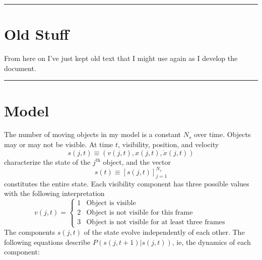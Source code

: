 \documentclass[12pt]{article}
\renewcommand{\th}{^{\text{th}}}
\newcommand{\os}[4]{{\left[ #1(#2) \right]}_{#3}^{#4}} %
\newcommand{\ti}[2]{{#1}{(#2)}}                         %
\begin{document}
\vfill \hrule
\section{Old Stuff}
\label{sec:old-stuff}

From here on I've just kept old text that I might use again as I
develop the document.\\
\hrule
\section{Model}
\label{sec:model}

The number of moving objects in my model is a constant $N_s$ over
time.  Objects may or may not be visible.  At time $t$, visibility,
position, and velocity
\begin{equation*}
  \ti{s}{j,t} \equiv \left(\ti{v}{j,t},\ti{x}{j,t},\ti{\dot x}{j,t} \right)
\end{equation*}
characterize the state of the $j\th$ object, and the vector
\begin{equation*}
  \ti{s}{t} \equiv \os{s}{j,t}{j=1}{N_s}
\end{equation*}
constitutes the entire state.  Each visibility component has three
possible values with the following interpretation
\begin{equation*}
  \ti{v}{j,t} =
  \begin{cases}
    1 & \text{Object is visible} \\
    2 & \text{Object is not visible for this frame} \\
    3 & \text{Object is not visible for at least three frames}
  \end{cases}
\end{equation*}
The components $\ti{s}{j,t}$ of the state evolve independently of each
other.  The following equations describe
$P(\ti{s}{j,t+1}|\ti{s}{j,t})$, ie, the dynamics of each component:
\end{document}
